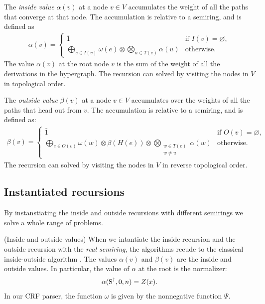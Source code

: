   \begin{definition}{} The \textit{inside value} $\alpha(v)$ at a node $v \in V$ accumulates the weight of all the paths that converge at that node. The accumulation is relative to a semiring, and is defined as
  \begin{align*}
    \alpha(v) =
      \begin{cases}
        \bar{1}  &  \mbox{if } I(v) = \varnothing,  \\
        \displaystyle\bigoplus_{e \in I(v)} \omega(e) \otimes \displaystyle\bigotimes_{u \in T(e)} \alpha(u)  & \mbox{otherwise.}
      \end{cases}
  \end{align*}
  The value $\alpha(v)$ at the root node $v$ is the sum of the weight of all the derivations in the hypergraph. The recursion can solved by visiting the nodes in $V$ in topological order.
  \end{definition}

  \begin{definition}{} The \textit{outside value} $\beta(v)$ at a node $v \in V$ accumulates over the weights of all the paths that head out from $v$. The accumulation is relative to a semiring, and is defined as:
  \begin{align*}
    \beta(v) =
      \begin{cases}
        \bar{1}  & \mbox{if } O(v) = \varnothing, \\
        \displaystyle\bigoplus_{e \in O(v)} \omega(w) \otimes \beta(H(e)) \otimes \displaystyle\bigotimes_{ \substack{ w \in T(e) \\ w \neq u } } \alpha(w)  & \mbox{otherwise.}
      \end{cases}
  \end{align*}
  The recursion can solved by visiting the nodes in $V$ in reverse topological order.
  \end{definition}

\subsection{Instantiated recursions}

By instanstiating the inside and outside recursions with different semirings we solve a whole range of problems.

\begin{example}{(Inside and outside values)}
  When we intantiate the inside recursion and the outside recursion with the \textit{real semiring}, the algorithms recude to the classical inside-outside algorithm \citep{baker1979trainable}. The values $\alpha(v)$ and $\beta(v)$ are the inside and outside values. In particular, the value of $\alpha$ at the root is the normalizer:
  \begin{align*}
    \alpha(\text{S}^{\dagger}, 0, n) = Z(x).
  \end{align*}
  In our CRF parser, the function $\omega$ is given by the nonnegative function $\Psi$.
\end{example}

